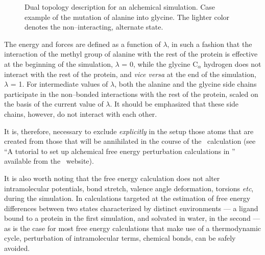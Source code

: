 \begin{figure}[ht]
  \caption{Dual topology description for an alchemical simulation.
         Case example of the mutation of alanine into glycine.
         The lighter color denotes the non--interacting, alternate
         state.}
  \label{fig:dual_top}
\end{figure}


The energy and forces
are defined as a function of $\lambda$, in such a fashion that 
the interaction of the methyl group of alanine with the rest of 
the protein is effective at the beginning of the simulation,
\ie $\lambda$ = 0, while
the glycine C$_\alpha$ hydrogen does not interact with the rest
of the protein, and {\it vice versa} at the end of the
simulation, \ie $\lambda$ = 1.
For intermediate values of $\lambda$, both the alanine and the glycine
side chains participate in the non--bonded interactions with the rest 
of the protein, scaled on the basis of the current value of $\lambda$.
It should be emphasized that these side chains, however,
do not interact with each other.


It is, therefore, necessary to exclude {\it explicitly} in the setup
those atoms 
that are created from those that will be annihilated in the 
course of the \FEP\ calculation (see ``A tutorial to set up 
alchemical free energy perturbation calculations in \NAMD''
available from the \NAMD\ website).


It is also worth noting that
the free energy calculation does not alter intramolecular
potentials, \ie bond stretch, valence angle deformation, torsions
{\it etc}, during the simulation.
In calculations targeted at the estimation
of free energy differences between two states characterized by
distinct environments --- \eg a ligand bound to a protein in
the first simulation,
and solvated in water, in the second --- as is the 
case for most free energy calculations that make use of a thermodynamic 
cycle, perturbation of intramolecular terms, 
\eg chemical bonds, can be safely
avoided.~\cite{Boresch.99a}



